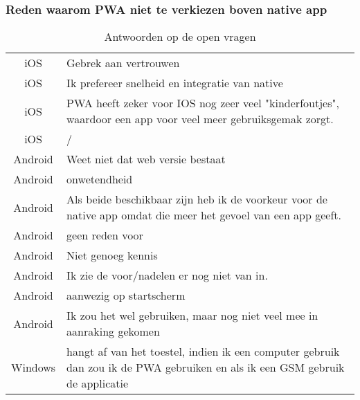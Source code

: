 	\subsubsection{Reden waarom PWA niet te verkiezen boven native app}
		\begin{table}[H]
			\centering
			\begin{tabular}{cp{12cm}}
				iOS & Gebrek aan vertrouwen \\
				iOS & Ik prefereer snelheid en integratie van native \\
				iOS & PWA heeft zeker voor IOS nog zeer veel "kinderfoutjes", waardoor een app voor veel meer gebruiksgemak zorgt. \\
				iOS & / \\
				Android & Weet niet dat web versie bestaat\\
				Android & onwetendheid\\
				Android & Als beide beschikbaar zijn heb ik de voorkeur voor de native app omdat die meer het gevoel van een app geeft.\\
				Android & geen reden voor\\
				Android & Niet genoeg kennis\\
				Android & Ik zie de voor/nadelen er nog niet van in.\\
				Android & aanwezig op startscherm\\
				Android & Ik zou het wel gebruiken, maar nog niet veel mee in
				aanraking gekomen \\
				Windows & hangt af van het toestel, indien ik een computer gebruik dan zou ik de PWA gebruiken en als ik een GSM gebruik de applicatie\\
			\end{tabular}	
			\caption{Antwoorden op de open vragen}
		\end{table}

	
	